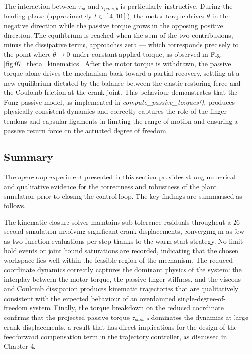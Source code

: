 The interaction between $\tau_m$ and $\tau_{pass,\theta}$ is particularly instructive. During the loading phase (approximately $t \in [4, 10]$), the motor torque drives $\theta$ in the negative direction while the passive torque grows in the opposing positive direction. The equilibrium is reached when the sum of the two contributions, minus the dissipative terms, approaches zero — which corresponds precisely to the point where $\dot{\theta} \rightarrow 0$ under constant applied torque, as observed in Fig. \ref{fig:07_theta_kinematics}. After the motor torque is withdrawn, the passive torque alone drives the mechanism back toward a partial recovery, settling at a new equilibrium dictated by the balance between the elastic restoring force and the Coulomb friction at the crank joint. This behaviour demonstrates that the Fung passive model, as implemented in \textit{compute\_passive\_torques()}, produces physically consistent dynamics and correctly captures the role of the finger tendons and capsular ligaments in limiting the range of motion and ensuring a passive return force on the actuated degree of freedom. 
 
\subsection{Summary}
The open-loop experiment presented in this section provides strong numerical and qualitative evidence for the correctness and robustness of the plant simulation prior to closing the control loop. The key findings are summarised as follows.

The kinematic closure solver maintains sub-tolerance residuals throughout a 26-second simulation involving significant crank displacements, converging in as few as two function evaluations per step thanks to the warm-start strategy. No limit-hold events or joint bound saturations are recorded, indicating that the chosen workspace lies well within the feasible region of the mechanism. The reduced-coordinate dynamics correctly captures the dominant physics of the system: the interplay between the motor torque, the passive finger stiffness, and the viscous and Coulomb dissipation produces kinematic trajectories that are qualitatively consistent with the expected behaviour of an overdamped single-degree-of-freedom system. Finally, the torque breakdown on the reduced coordinate confirms that the projected passive torque $\tau_{pass,\theta}$ dominates the dynamics at large crank displacements, a result that has direct implications for the design of the feedforward compensation term in the trajectory controller, as discussed in Chapter 4.
